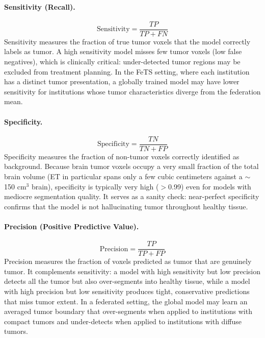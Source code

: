 \documentclass{article}
\begin{document}
\paragraph{Sensitivity (Recall).}
\begin{equation}
    \text{Sensitivity} = \frac{TP}{TP + FN}
\end{equation}
Sensitivity measures the fraction of true tumor voxels that the model correctly labels as tumor. A high sensitivity model misses few tumor voxels (low false negatives), which is clinically critical: under-detected tumor regions may be excluded from treatment planning. In the FeTS setting, where each institution has a distinct tumor presentation, a globally trained model may have lower sensitivity for institutions whose tumor characteristics diverge from the federation mean.

\paragraph{Specificity.}
\begin{equation}
    \text{Specificity} = \frac{TN}{TN + FP}
\end{equation}
Specificity measures the fraction of non-tumor voxels correctly identified as background. Because brain tumor voxels occupy a very small fraction of the total brain volume (ET in particular spans only a few cubic centimeters against a $\sim$150 cm$^3$ brain), specificity is typically very high ($>$0.99) even for models with mediocre segmentation quality. It serves as a sanity check: near-perfect specificity confirms that the model is not hallucinating tumor throughout healthy tissue.

\paragraph{Precision (Positive Predictive Value).}
\begin{equation}
    \text{Precision} = \frac{TP}{TP + FP}
\end{equation}
Precision measures the fraction of voxels predicted as tumor that are genuinely tumor. It complements sensitivity: a model with high sensitivity but low precision detects all the tumor but also over-segments into healthy tissue, while a model with high precision but low sensitivity produces tight, conservative predictions that miss tumor extent. In a federated setting, the global model may learn an averaged tumor boundary that over-segments when applied to institutions with compact tumors and under-detects when applied to institutions with diffuse tumors.
\end{document}
